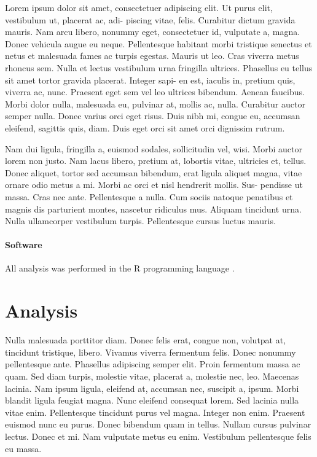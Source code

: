 \documentclass[11pt,a4paper,twoside]{article}\usepackage[]{graphicx}\usepackage[]{color}
\newcommand{\prog}[1]{\textsf{#1}}
\begin{document}
Lorem ipsum dolor sit amet, consectetuer adipiscing elit. Ut purus
elit, vestibulum ut, placerat ac, adi- piscing vitae, felis. Curabitur
dictum gravida mauris. Nam arcu libero, nonummy eget, consectetuer
id, vulputate a, magna. Donec vehicula augue eu neque. Pellentesque
habitant morbi tristique senectus et netus et malesuada fames ac turpis
egestas. Mauris ut leo. Cras viverra metus rhoncus sem. Nulla et lectus
vestibulum urna fringilla ultrices. Phasellus eu tellus sit amet tortor
gravida placerat. Integer sapi- en est, iaculis in, pretium quis,
viverra ac, nunc. Praesent eget sem vel leo ultrices bibendum. Aenean
faucibus. Morbi dolor nulla, malesuada eu, pulvinar at, mollis ac,
nulla. Curabitur auctor semper nulla. Donec varius orci eget risus.
Duis nibh mi, congue eu, accumsan eleifend, sagittis quis, diam. Duis
eget orci sit amet orci dignissim rutrum. 

Nam dui ligula, fringilla a, euismod sodales, sollicitudin vel, wisi.
Morbi auctor lorem non justo. Nam lacus libero, pretium at, lobortis
vitae, ultricies et, tellus. Donec aliquet, tortor sed accumsan bibendum,
erat ligula aliquet magna, vitae ornare odio metus a mi. Morbi ac
orci et nisl hendrerit mollis. Sus- pendisse ut massa. Cras nec ante.
Pellentesque a nulla. Cum sociis natoque penatibus et magnis dis parturient
montes, nascetur ridiculus mus. Aliquam tincidunt urna. Nulla ullamcorper
vestibulum turpis. Pellentesque cursus luctus mauris. 

\paragraph{Software} All analysis was performed in the \prog{R} programming language \citep{R}.

\section{Analysis} \label{sec:analysis}
Nulla malesuada porttitor diam. Donec felis erat, congue non, volutpat
at, tincidunt tristique, libero. Vivamus viverra fermentum felis.
Donec nonummy pellentesque ante. Phasellus adipiscing semper elit.
Proin fermentum massa ac quam. Sed diam turpis, molestie vitae, placerat
a, molestie nec, leo. Maecenas lacinia. Nam ipsum ligula, eleifend
at, accumsan nec, suscipit a, ipsum. Morbi blandit ligula feugiat
magna. Nunc eleifend consequat lorem. Sed lacinia nulla vitae enim.
Pellentesque tincidunt purus vel magna. Integer non enim. Praesent
euismod nunc eu purus. Donec bibendum quam in tellus. Nullam cursus
pulvinar lectus. Donec et mi. Nam vulputate metus eu enim. Vestibulum
pellentesque felis eu massa.
\end{document}
